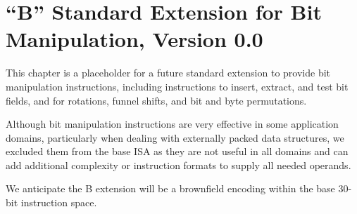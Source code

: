 \chapter{``B'' Standard Extension for Bit Manipulation, Version 0.0}
\label{sec:bits}

This chapter is a placeholder for a future standard extension to
provide bit manipulation instructions, including instructions to
insert, extract, and test bit fields, and for rotations, funnel
shifts, and bit and byte permutations.

\begin{commentary}
Although bit manipulation instructions are very effective in some
application domains, particularly when dealing with externally packed
data structures, we excluded them from the base ISA as they are not
useful in all domains and can add additional complexity or instruction
formats to supply all needed operands.

We anticipate the B extension will be a brownfield encoding within the
base 30-bit instruction space.
\end{commentary}

